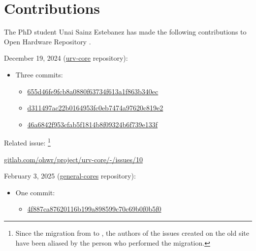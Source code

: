 \section{Contributions}
\label{contrib}

\noindent The PhD student Unai Sainz Estebanez has made the following contributions to Open Hardware Repository \cite{ohwr}.

\vspace{5mm}

\noindent December 19, 2024 (\href{https://gitlab.com/ohwr/project/urv-core}{urv-core} repository):

\begin{itemize}
\item Three commits:
    \begin{itemize}
    \item \href{https://gitlab.com/ohwr/project/urv-core/-/commit/655d46fe9fcb8a0880f63734f613a1f863b340ec}{655d46fe9fcb8a0880f63734f613a1f863b340ec}
    \item \href{https://gitlab.com/ohwr/project/urv-core/-/commit/d311497ac22b0164953fc0eb7474a97620c819e2}{d311497ac22b0164953fc0eb7474a97620c819e2}
    \item \href{https://gitlab.com/ohwr/project/urv-core/-/commit/46a6842f953cfab5f1814b8f09324b6f739e133f}{46a6842f953cfab5f1814b8f09324b6f739e133f}
    \end{itemize}
\end{itemize}

\noindent Related issue: \footnote{Since the migration from  to , the authors of the issues created on the old site have been aliased by the person who performed the migration.}

\vspace{5mm}

\href{https://gitlab.com/ohwr/project/urv-core/-/issues/10}{gitlab.com/ohwr/project/urv-core/-/issues/10}

\vspace{5mm}

\noindent February 3, 2025 (\href{https://gitlab.com/ohwr/project/general-cores/}{general-cores} repository):

\begin{itemize}
\item One commit:
    \begin{itemize}
    \item \href{https://gitlab.com/ohwr/project/general-cores/-/commit/4f887ca87620116b199a898599c70c69b0f0b5f0}{4f887ca87620116b199a898599c70c69b0f0b5f0}
    \end{itemize}
\end{itemize}

